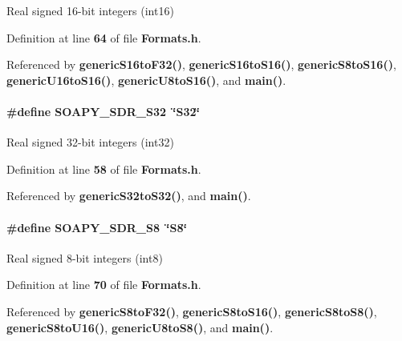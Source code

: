 Real signed 16-\/bit integers (int16) 



Definition at line {\bf 64} of file {\bf Formats.\+h}.



Referenced by {\bf generic\+S16to\+F32()}, {\bf generic\+S16to\+S16()}, {\bf generic\+S8to\+S16()}, {\bf generic\+U16to\+S16()}, {\bf generic\+U8to\+S16()}, and {\bf main()}.

\paragraph[{S\+O\+A\+P\+Y\+\_\+\+S\+D\+R\+\_\+\+S32}]{\setlength{\rightskip}{0pt plus 5cm}\#define S\+O\+A\+P\+Y\+\_\+\+S\+D\+R\+\_\+\+S32~\char`\"{}S32\char`\"{}}\label{Formats_8h_a3a201a33b36c5b031409d049b5ebc30f}


Real signed 32-\/bit integers (int32) 



Definition at line {\bf 58} of file {\bf Formats.\+h}.



Referenced by {\bf generic\+S32to\+S32()}, and {\bf main()}.

\paragraph[{S\+O\+A\+P\+Y\+\_\+\+S\+D\+R\+\_\+\+S8}]{\setlength{\rightskip}{0pt plus 5cm}\#define S\+O\+A\+P\+Y\+\_\+\+S\+D\+R\+\_\+\+S8~\char`\"{}S8\char`\"{}}\label{Formats_8h_af7100fd597f07b1ac96bfa04d06c45c0}


Real signed 8-\/bit integers (int8) 



Definition at line {\bf 70} of file {\bf Formats.\+h}.



Referenced by {\bf generic\+S8to\+F32()}, {\bf generic\+S8to\+S16()}, {\bf generic\+S8to\+S8()}, {\bf generic\+S8to\+U16()}, {\bf generic\+U8to\+S8()}, and {\bf main()}.

